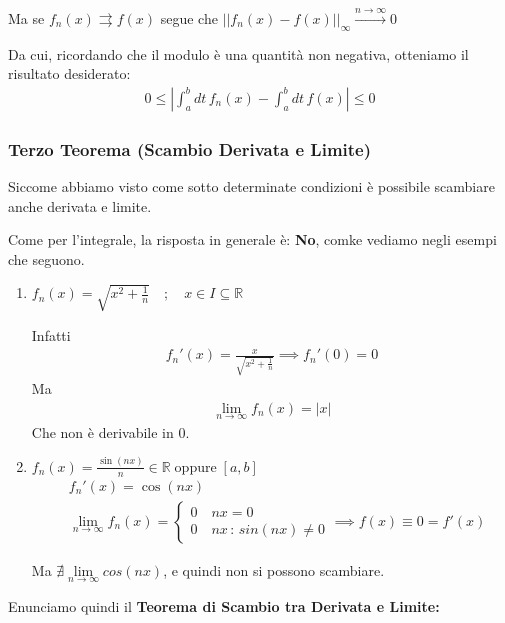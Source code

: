 Ma se $f_n(x) \rightrightarrows f(x)$ segue che $||f_n(x) -  f(x)||_\infty \overset{n\rightarrow \infty}{\longrightarrow} 0$

Da cui, ricordando che il modulo è una quantità non negativa, otteniamo il risultato desiderato:
\begin{align}
0 \leq \left|\int_{a}^{b} dt \, f_n(x) - \int_{a}^{b} dt \, f(x)\right| \leq 0
\end{align}

\subsubsection{Terzo Teorema (Scambio Derivata e Limite)}

Siccome abbiamo visto come sotto determinate condizioni è possibile scambiare anche derivata e limite. 

Come per l'integrale, la risposta in generale è: \textbf{No}, comke vediamo negli esempi che seguono.

\begin{enumerate}
	\item $f_n(x)= \sqrt{x^2 + \frac{1}{n}} \quad; \quad x\in I\subseteq \mathbb{R}$
		
		Infatti
		\begin{align}
		f_n'(x)= \frac{x}{\sqrt{x^2 + \frac{1}{n}}} \implies f_n'(0) = 0 
		\end{align}
		Ma
		\begin{align}
		\underset{n\rightarrow \infty}{\lim} f_n(x)= |x|
		\end{align}
		Che non è derivabile in 0.
	
	\item $f_n(x) = \frac{\sin(nx)}{n}\in \mathbb{R} \; \text{oppure} \; [a,b]$ 
		\begin{align}
		{}&f_n'(x)=\cos(nx)\\
		&\underset{n\rightarrow \infty}{\lim} f_n(x)= \left\{
		\begin{array}{cc}
			0 \quad nx=0  \quad \quad \quad \quad \;\; \\
			0 \quad nx \, : \, sin(nx) \neq 0
		\end{array}
		\right. \implies f(x) \equiv 0 = f'(x)
		\end{align}
	
	Ma $\nexists \underset{n\rightarrow \infty}{\lim} cos(nx)$, e quindi non si possono scambiare.
\end{enumerate}	 

Enunciamo quindi il \textbf{Teorema di Scambio tra Derivata e Limite:}

